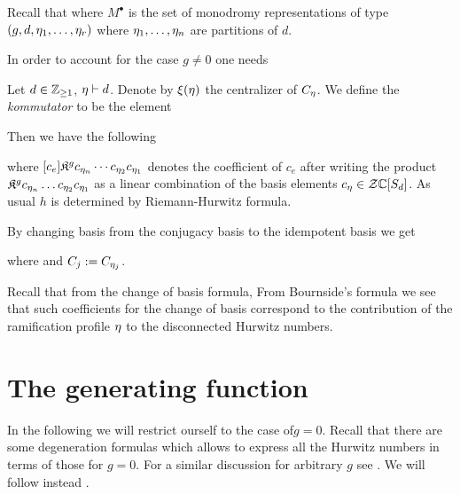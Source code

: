 \documentclass[../main/main.tex]{subfiles}
\begin{document}
Recall that 
where $M^\bullet$ is the set of monodromy representations of type $(g,d,\eta_1,\ldots,\eta_r)$ where $\eta_1,\ldots,\eta_n$ are partitions of $d$. 

In order to account for the case $g\neq0$ one needs 
\begin{definition}
	Let $d\in\mathbb Z_{\geq1}$, $\eta\vdash d$. Denote by $\xi(\eta)$ the centralizer of $C_\eta$. We define the \emph{kommutator} to be the element
\end{definition}

Then we have the following
\begin{proposition}[{\cite[Prop. 9.2.3]{CM}}]
	where $[c_e]\mathfrak K^gc_{\eta_n}\cdots c_{\eta_2}c_{\eta_1}$ denotes the coefficient of $c_e$ after writing the product $\mathfrak K^gc_{\eta_n}\ldots c_{\eta_2}c_{\eta_1}$ as a linear combination of the basis elements $c_\eta\in\mathcal Z\mathbb C[S_d]$. As usual $h$ is determined by Riemann-Hurwitz formula. 
\end{proposition}

By changing basis from the conjugacy basis to the idempotent basis we get

\begin{theorem}
	where
	and $C_j:=C_{\eta_j}$.
\end{theorem}

Recall that from the change of basis formula, 
From Bournside's formula we see that such coefficients for the change of basis correspond to the contribution of the ramification profile $\eta$ to the disconnected Hurwitz numbers. 


\section{The generating function}

In the following we will restrict ourself to the case of$g=0$. Recall that there are some degeneration formulas which allows to express all the Hurwitz numbers in terms of those for $g=0$. For a similar discussion for arbitrary $g$ see \cite[§10]{CM}. We will follow instead \cite[§§2.2,2.3]{O1}. 
\end{document}
